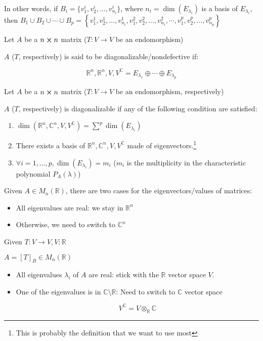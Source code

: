 In other words, if $B_i = \{v_1^i, v_2^i, \ldots, v_{n_i}^i\}$, where $n_i = \dim(E_{\lambda_i})$ is a basis of $E_{\lambda_i}$, then $B_1 \cup B_2 \cup \cdots \cup B_p = \left\{v_1^1, v_2^1, \ldots, v_{n_i}^1, v_1^2, v_2^2, \ldots, v_{n_i}^2, \cdots, v_1^p, v_2^p, \ldots, v_{n_p}^p\right\}$

\begin{definition}
	Let $A$ be a $n \cross n$ matrix ($T:V \to V$ be an endomorphism)

	$A$ ($T$, respectively) is said to be diagonalizable/nondefective if:

	\[\mathbb{R}^n, \mathbb{R}^n, V, V^{\mathbb{C}} = E_{\lambda_1} \oplus \cdots \oplus E_{\lambda_p}\]
\end{definition}

\begin{theorem}
	Let $A$ be a $n\cross n$ matrix ($T:V \to V$ be an endomorphism, respectively)

	$A$ ($T$, respectively) is diagonalizable if any of the following condition are satisfied:

	\begin{enumerate}
		\item $\dim(\mathbb{R}^n, \mathbb{C}^n, V, V^\mathbb{C}) = \sum^{p} \dim(E_{\lambda_i})$
		\item There exists a basis of $\mathbb{R}^n, \mathbb{C}^n, V, V^\mathbb{C}$ made of eigenvectors.\footnote{This is probably the definition that we want to use most}
		\item $\forall i = 1, \ldots, p, \dim(E_{\lambda_i}) = m_i$ ($m_i$ is the multiplicity in the characteristic polynomial $P_A(\lambda)$)
	\end{enumerate}
\end{theorem}

\begin{remark}
	Given $A \in M_n(\mathbb{R})$, there are two cases for the eigenvectors/values of matrices:

	\begin{itemize}
		\item All eigenvalues are real: we stay in $\mathbb{R}^n$
		\item Otherwise, we need to switch to $\mathbb{C}^n$
	\end{itemize}

	Given $T:V \to V, V: \mathbb{R}$

	$A = [T]_B \in M_n(\mathbb{R})$

	\begin{itemize}
		\item All eigenvalues $\lambda_i$ of $A$ are real: stick with the $\mathbb{R}$ vector space $V$.
		\item One of the eigenvalues is in $\mathbb{C}\setminus\mathbb{R}$: Need to switch to $\mathbb{C}$ vector space
		
		\[V^\mathbb{C} = V \otimes_\mathbb{R} \mathbb{C}\]
	\end{itemize}
\end{remark}


